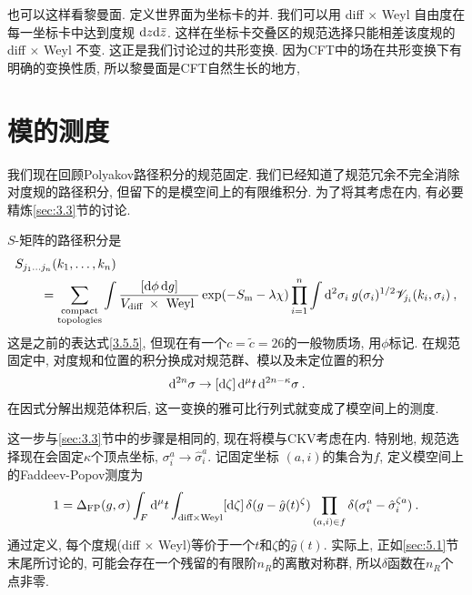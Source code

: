 也可以这样看黎曼面. 定义世界面为坐标卡的并. 我们可以用 diff $\times$ Weyl 自由度在每一坐标卡中达到度规 $\mathrm{d} z \mathrm{d} \bar{z}$. 
这样在坐标卡交叠区的规范选择只能相差该度规的diff $\times$ Weyl 不变. 这正是我们讨论过的共形变换. 
因为CFT中的场在共形变换下有明确的变换性质, 所以黎曼面是CFT自然生长的地方, 

\section{\texorpdfstring{模的测度}{5.3 The measure for moduli}} \label{sec:5.3}

我们现在回顾Polyakov路径积分的规范固定. 我们已经知道了规范冗余不完全消除对度规的路径积分, 但留下的是模空间上的有限维积分. 
为了将其考虑在内, 有必要精炼\ref{sec:3.3}节的讨论.

$S$-矩阵的路径积分是
	\begin{align}
		&S_{j_{1} \ldots j_{n}}(k_{1}, \ldots, k_{n})  \nonumber \\
		&\qquad=\sum_{\substack{\text{compact} \\ \text {topologies}}} \int \frac{[\mathrm{d} \phi \,\mathrm{d} g]}{V_{\text {diff }} \times \text { Weyl }} 
				\exp (-S_{\mathrm{m}}-\lambda \chi) \prod_{i=1}^{n} \int \mathrm{d}^{2} \sigma_{i} \: g(\sigma_{i})^{1 / 2} 
				\mathscr{V}_{j_{i}}(k_{i}, \sigma_{i}) \:, \label{5.3.1}
	\end{align}
这是之前的表达式\eqref{3.5.5}, 但现在有一个$c=\tilde{c}=26$的一般物质场, 用$\phi$标记. 在规范固定中, 对度规和位置的积分换成对规范群、模以及未定位置的积分
\begin{equation}
	[\dif g]\, \dif^{2 n} \sigma \rightarrow [\dif \zeta] \,\dif^{\mu} t \,\dif^{2 n-\kappa} \sigma \:. \label{5.3.2}
\end{equation}
在因式分解出规范体积后, 这一变换的雅可比行列式就变成了模空间上的测度.

这一步与\ref{sec:3.3}节中的步骤是相同的, 现在将模与CKV考虑在内. 特别地, 规范选择现在会固定$\kappa$个顶点坐标, $\sigma_{i}^{a} \rightarrow \hat{\sigma}_{i}^{a}$. 
记固定坐标 $(a, i)$的集合为$f$, 定义模空间上的Faddeev-Popov测度为
\begin{equation}
	1=\Delta_{\mathrm{FP}}(g, \sigma) \int_{F} \mathrm{d}^{\mu} t \int_{\text{diff} \times \text{Weyl}}[\mathrm{d} \zeta] \,
	\delta(g-\hat{g}(t)^{\zeta}) \prod_{(a, i) \in f} \delta(\sigma_{i}^{a}-\hat{\sigma}_{i}^{\zeta a}) \:. \label{5.3.3}
\end{equation}
通过定义, 每个度规(diff $\times$ Weyl)等价于一个$t$和$\zeta $的$\hat{g}(t)$. 实际上, 正如\ref{sec:5.1}节末尾所讨论的, 可能会存在一个残留的有限阶$n_{R}$的离散对称群, 所以$\delta$函数在$n_{R}$个点非零.

